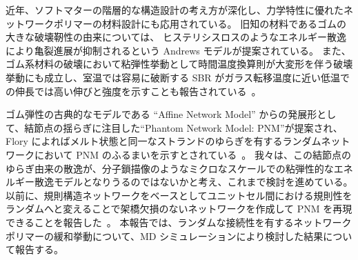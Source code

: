 \documentclass[uplatex,dvipdfmx,a4paper,10pt]{jsarticle}
\makeatletter
\def\subsection{\@startsection{subsection}{2}{\z@}{0.2\Cvs \@plus.5\Cdp \@minus.2\Cdp}{0.1\Cvs \@plus.3\Cdp}{\reset@font\normalsize\bfseries}}
\makeatother
\begin{document}
近年、ソフトマターの階層的な構造設計の考え方が深化し、力学特性に優れたネットワークポリマーの材料設計にも応用されている。
旧知の材料であるゴムの大きな破壊靭性の由来については、 ヒステリシスロスのようなエネルギー散逸により亀裂進展が抑制されるという Andrews モデルが提案されている\cite{andrews}。
また、ゴム系材料の破壊において粘弾性挙動として時間温度換算則が大変形を伴う破壊挙動にも成立し、室温では容易に破断する SBR がガラス転移温度に近い低温での伸長では高い伸びと強度を示すことも報告されている~\cite{smith}。

ゴム弾性の古典的なモデルである ``Affine Network Model'' からの発展形として、結節点の揺らぎに注目した``Phantom Network Model: PNM''が提案され、Flory によればメルト状態と同一なストランドのゆらぎを有するランダムネットワークにおいて PNM のふるまいを示すとされている~\cite{flory}。
我々は、この結節点のゆらぎ由来の散逸が、分子鎖描像のようなミクロなスケールでの粘弾性的なエネルギー散逸モデルとなりうるのではないかと考え、これまで検討を進めている。
以前に、規則構造ネットワークをベースとしてユニットセル間における規則性をランダムへと変えることで架橋欠損のないネットワークを作成して PNM を再現できることを報告した~\cite{sasaki}。
本報告では、ランダムな接続性を有するネットワークポリマーの緩和挙動について、MD シミュレーションにより検討した結果について報告する。






\end{document}
